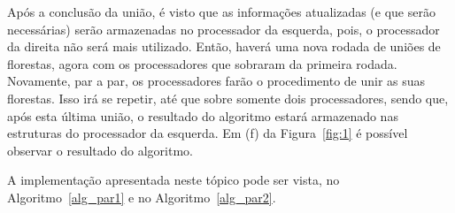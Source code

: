 \documentclass[12pt]{article}
\begin{document}
Após a conclusão da união, é visto que as informações atualizadas (e que serão necessárias) serão armazenadas no processador da esquerda, pois, o processador da direita não será mais utilizado. Então, haverá uma nova rodada de uniões de florestas, agora com os processadores que sobraram da primeira rodada. Novamente, par a par, os processadores farão o procedimento de unir as suas florestas. Isso irá se repetir, até que sobre somente dois processadores, sendo que, após esta última união, o resultado do algoritmo estará armazenado nas estruturas do processador da esquerda. Em (f) da Figura~\ref{fig:1} é possível observar o resultado do algoritmo.

A implementação apresentada neste tópico pode ser vista, no Algoritmo~\ref{alg_par1} e no Algoritmo~\ref{alg_par2}.
\end{document}
